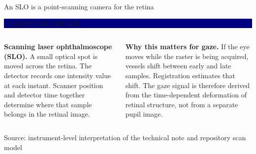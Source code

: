 \documentclass[aspectratio=169,9pt,xcolor=table]{beamer}
\newcommand{\evidence}[2]{%
  \vspace{-0.06cm}\hfill
  \colorbox{#2}{\color{white}\bfseries\scriptsize\strut\ #1\ }\par
  \vspace{0.04cm}
}
\newcommand{\source}[1]{\vfill{\color{Mid}\tiny Source: #1}}
\begin{document}
\begin{frame}{An SLO is a point-scanning camera for the retina}
  \evidence{HARDWARE PRIMER}{Navy}
  \begin{columns}[T,onlytextwidth]
      \textbf{Scanning laser ophthalmoscope (SLO).}
      A small optical spot is moved across the retina. The detector records one intensity
      value at each instant. Scanner position and detector time together determine where that
      sample belongs in the retinal image.

      \vspace{0.25cm}
      \textbf{Why this matters for gaze.}
      If the eye moves while the raster is being acquired, vessels shift between early and late
      samples. Registration estimates that shift. The gaze signal is therefore derived from the
      time-dependent deformation of retinal structure, not from a separate pupil image.
  \end{columns}
  \source{instrument-level interpretation of the technical note and repository scan model}
\end{frame}
\end{document}

